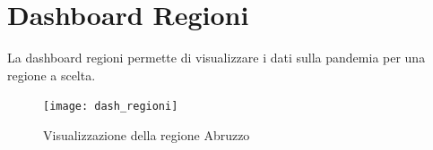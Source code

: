 \section{Dashboard Regioni}
La dashboard regioni permette di visualizzare i dati sulla pandemia per una regione a scelta.

\begin{figure}[htp]
    \centering
    \texttt{[image: dash\_regioni]}
    \caption{Visualizzazione della regione Abruzzo}
    \label{fig:dash_regioni}
\end{figure}